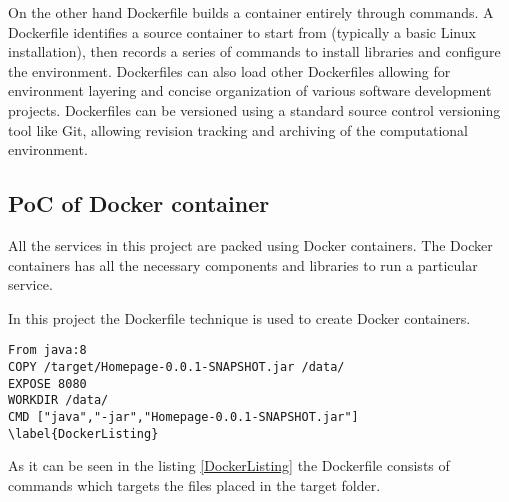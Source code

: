 On the other hand Dockerfile builds a container entirely through commands. A Dockerfile identifies a source container to start from (typically a basic Linux installation), then records a series of commands to install libraries and configure the environment. Dockerfiles can also load other Dockerfiles allowing for environment layering and concise organization of various software development projects. Dockerfiles can be versioned using a standard source control versioning tool like Git, allowing revision tracking and archiving of the computational environment.

\subsection{PoC of Docker container}
All the services in this project are packed using Docker containers. The Docker containers has all the necessary components and libraries to run a particular service. 

In this project the Dockerfile technique is used to create Docker containers. 

\begin{lstlisting}
From java:8
COPY /target/Homepage-0.0.1-SNAPSHOT.jar /data/
EXPOSE 8080
WORKDIR /data/
CMD ["java","-jar","Homepage-0.0.1-SNAPSHOT.jar"]
\label{DockerListing}
\end{lstlisting}

As it can be seen in the listing \ref{DockerListing} the Dockerfile consists of commands which targets the files placed in the target folder. 

















 